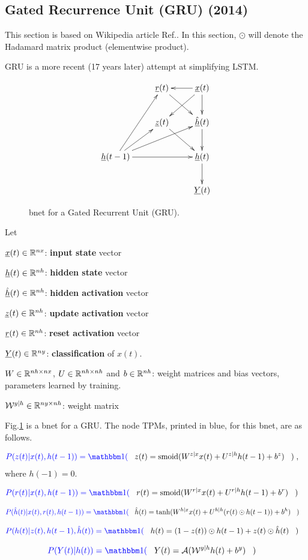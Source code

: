 \newpage
\subsection{Gated Recurrence Unit
 (GRU) (2014)}

This 
section is based 
on Wikipedia article Ref.\cite{gru}. In this section,
$\odot$
will denote the Hadamard matrix product
(elementwise product).

GRU is a more recent (17 years later)
attempt at simplifying LSTM.

\begin{figure}[h!]
\centering
$$\xymatrix{
&\rvr(t)\ar[dr]&\rvx(t)\ar[d]\ar[dl]\ar[l]
\\
&\rvz(t)\ar[dr]
&\hat{\rvh}(t)\ar[d]
\\
\rvh(t-1)\ar[ur]\ar[rr]\ar[urr]\ar[uur]
&&\rvh(t)\ar[d]
\\
&&\rvY(t)
}$$
\caption{bnet for a Gated
Recurrent Unit (GRU).}
\label{fig-rnn-gru}
\end{figure}

Let

${\underline{x}}(t)\in { \mathbb{R}}^{nx}$: {\bf input state} vector

${\underline{h}}(t)\in{ \mathbb{R}}^{nh}$: {\bf hidden state} vector

$\hat{{\underline{h}}}(t)\in{ \mathbb{R}}^{nh}$: {\bf hidden activation} vector

${\underline{z}}(t)\in{ \mathbb{R}}^{nh}$: {\bf update activation} vector

${\underline{r}}(t)\in{ \mathbb{R}}^{nh}$: {\bf reset activation} vector

${\underline{Y}}(t)\in { \mathbb{R}}^{ny}$:
{\bf classification} of $x(t)$.

$W\in { \mathbb{R}}^{nh\times nx}$,
$U\in { \mathbb{R}}^{nh\times nh}$
and 
$b\in { \mathbb{R}}^{nh}$:
weight matrices and bias vectors,
 parameters learned by training.

${\cal W}^{y|h}\in { \mathbb{R}}^{ny\times nh}$:
 weight matrix

Fig.\ref{fig-rnn-gru}
is a bnet
for a GRU.
The node TPMs, printed in blue,
for this bnet, are
as follows.


\begin{align}\color{blue}
P(z(t)|x(t),h(t-1))=\indi(\;\;\;&
z(t) = \smoid(W^{z|x} x(t) + U^{z|h} h(t-1) + b^z)
\;\;\;)
\;,
\end{align}
where $h(-1)=0$.

\begin{align}\color{blue}
P(r(t)|x(t), h(t-1))=\indi(\;\;\;&
r(t) = \smoid(W^{r|x} x(t) + U^{r|h} h(t-1) + b^r)
\;\;\;)
\end{align}

\begin{align}\color{blue}
P(\hat{h}(t)|x(t), r(t), h(t-1))=
\indi(\;\;\;&
\hat{h}(t) = \tanh(W^{h|x} x(t) +
 U^{h|h} (r(t) \odot h(t-1)) + b^h)
\;\;\;)
\end{align}

\begin{align}\color{blue}
P(h(t)|z(t), h(t-1),\hat{h}(t))=\indi(\;\;\;&
h(t) =  (1 - z(t)) \odot h(t-1) +
 z(t) \odot \hat{h}(t)
\;\;\;)
\end{align}

\begin{align}\color{blue}
P(Y(t)|h(t))=\indi(\;\;\;&
Y(t)= \cala(\calw^{y|h}h(t) + b^y)\;\;\;)
\end{align}